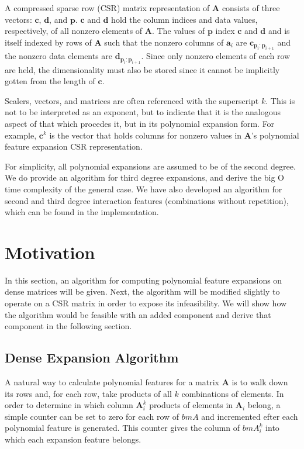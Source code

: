 \documentclass{article} %
\begin{document}
A compressed sparse row (CSR) matrix representation of $\bm{A}$ consists of three vectors: $\bm{c}$, $\bm{d}$, and $\bm{p}$.
$\bm{c}$ and $\bm{d}$ hold the column indices and data values, respectively, of all nonzero elements of $\bm{A}$.
The values of $\bm{p}$ index $\bm{c}$ and $\bm{d}$ and is itself indexed by rows of $\bm{A}$ such that the nonzero columns of $\bm{a}_i$ are $\bm{c}_{\bm{p}_i:\bm{p}_{i+1}}$ and the nonzero data elements are $\bm{d}_{\bm{p}_i:\bm{p}_{i+1}}$.
Since only nonzero elements of each row are held, the dimensionality must also be stored since it cannot be implicitly gotten from the length of $\bm{c}$.

Scalers, vectors, and matrices are often referenced with the superscript $k$.
This is not to be interpreted as an exponent, but to indicate that it is the analogous aspect of that which procedes it, but in its polynomial expansion form.
For example, $\bm{c}^k$ is the vector that holds columns for nonzero values in $\bm{A}$'s polynomial feature expansion CSR representation.

For simplicity, all polynomial expansions are assumed to be of the second degree.
We do provide an algorithm for third degree expansions, and derive the big O time complexity of the general case.
We have also developed an algorithm for second and third degree interaction features (combinations without repetition), which can be found in the implementation.

\section{Motivation}
In this section, an algorithm for computing polynomial feature expansions on dense matrices will be given.
Next, the algorithm will be modified slightly to operate on a CSR matrix in order to expose its infeasibility.
We will show how the algorithm would be feasible with an added component and derive that component in the following section.

\subsection{Dense Expansion Algorithm}
A natural way to calculate polynomial features for a matrix $\bm{A}$ is to walk down its rows and, for each row, take products of all $k$ combinations of elements.
In order to determine in which column $\bm{A}^k_i$ products of elements in $\bm{A}_i$ belong, a simple counter can be set to zero for each row of $bm{A}$ and incremented efter each polynomial feature is generated.
This counter gives the column of $bm{A}^k_i$ into which each expansion feature belongs.
\end{document}
